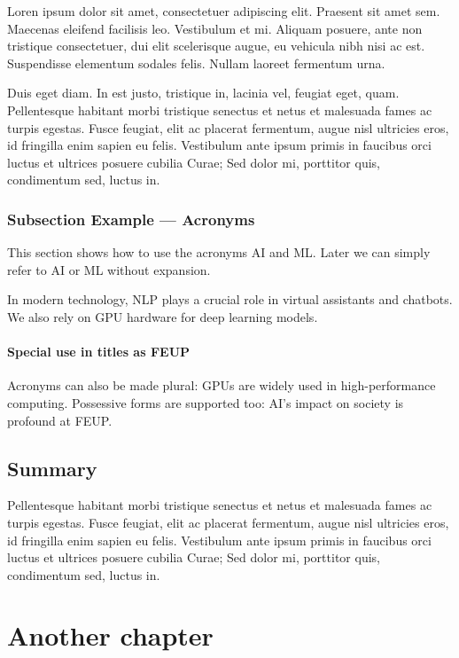 Loren ipsum dolor sit amet, consectetuer adipiscing elit. 
Praesent sit amet sem. Maecenas eleifend facilisis leo. Vestibulum et
mi. Aliquam posuere, ante non tristique consectetuer, dui elit
scelerisque augue, eu vehicula nibh nisi ac est. Suspendisse elementum
sodales felis. Nullam laoreet fermentum urna. 

Duis eget diam. In est justo, tristique in, lacinia vel, feugiat eget,
quam. Pellentesque habitant morbi tristique senectus et netus et
malesuada fames ac turpis egestas. Fusce feugiat, elit ac placerat
fermentum, augue nisl ultricies eros, id fringilla enim sapien eu
felis. Vestibulum ante ipsum primis in faucibus orci luctus et
ultrices posuere cubilia Curae; Sed dolor mi, porttitor quis,
condimentum sed, luctus in. 

\subsection{Subsection Example --- Acronyms} \label{sec:acronym}

This section shows how to use the acronyms \ac{AI} and \ac{ML}.  
Later we can simply refer to \ac{AI} or \ac{ML} without expansion.

In modern technology, \ac{NLP} plays a crucial role in virtual assistants 
and chatbots.  
We also rely on \ac{GPU} hardware for deep learning models.

\subsubsection{Special use in titles as \acs*{FEUP}}

Acronyms can also be made plural: \acp{GPU} are widely used in 
high-performance computing.  
Possessive forms are supported too: \ac{AI}'s impact on society is 
profound at \ac{FEUP}.

\section{Summary}

Pellentesque habitant morbi tristique senectus et netus et
malesuada fames ac turpis egestas. Fusce feugiat, elit ac placerat
fermentum, augue nisl ultricies eros, id fringilla enim sapien eu
felis. Vestibulum ante ipsum primis in faucibus orci luctus et
ultrices posuere cubilia Curae; Sed dolor mi, porttitor quis,
condimentum sed, luctus in. 


\chapter{Another chapter}


